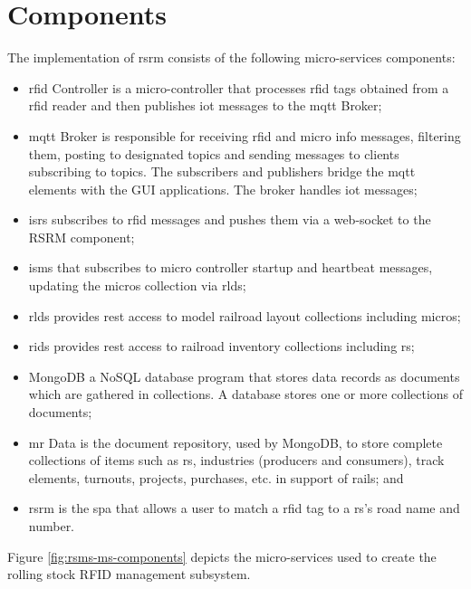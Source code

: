 \section{Components}
The implementation of \gls{rsrm} consists of the following micro-services components:
\begin{itemize}
\item \gls{rfid} Controller is a micro-controller that processes \gls{rfid} tags obtained from a \gls{rfid} reader and then publishes \gls{iot} messages to the \gls{mqtt} Broker;
\item \gls{mqtt} Broker is responsible for receiving \gls{rfid} and micro info messages, filtering them, posting to designated topics and sending messages to clients subscribing to topics. 
The subscribers and publishers bridge the \gls{mqtt} elements with the GUI applications. The broker handles \gls{iot} messages;
\item \gls{isrs} subscribes to \gls{rfid} messages and pushes them via a web-socket to the RSRM component;
\item \gls{isms} that subscribes to micro controller startup and heartbeat messages, updating the micros collection via \gls{rlds};
\item \gls{rlds} provides \gls{rest} access to model railroad layout collections including micros;
\item \gls{rids} provides \gls{rest} access to railroad inventory collections including \gls{rs};
\item MongoDB a NoSQL database program that stores data records as documents which are gathered in collections. A database stores one or more collections of documents;
\item \gls{mr} Data is the document repository, used by MongoDB, to store complete collections of items such as \gls{rs}, industries (producers and consumers), track elements, 
turnouts, projects, purchases, etc. in support of \gls{rails}; and
\item \gls{rsrm} is the \gls{spa} that allows a user to match a \gls{rfid} tag to a \gls{rs}'s road name and number.
\end{itemize}
Figure \ref{fig:rsms-ms-components} depicts the micro-services used to create the rolling stock RFID management subsystem.

